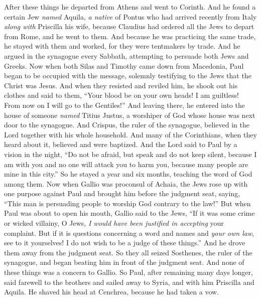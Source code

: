 \begin{biblechapter} %
 After these things he departed from Athens and went to Corinth.
\verse And he found a certain Jew \textit{named} Aquila, \textit{a native} of Pontus who had arrived recently from Italy \textit{along with} Priscilla his wife, because Claudius had ordered all the Jews to depart from Rome, and he went to them.
\verse And because he was practicing the same trade, he stayed with them and worked, for they were tentmakers by trade.
\verse And he argued in the synagogue every Sabbath, attempting to persuade both Jews and Greeks.
\verse Now when both Silas and Timothy came down from Macedonia, Paul began to be occupied with the message, solemnly testifying to the Jews that the Christ was Jesus.
\verse And when they resisted and reviled him, he shook out his clothes and said to them, “Your blood be on your own heads! I am guiltless! From now on I will go to the Gentiles!”
\verse And leaving there, he entered into the house of someone \textit{named} Titius Justus, a worshiper of God whose house was next door to the synagogue.
\verse And Crispus, the ruler of the synagogue, believed in the Lord together with his whole household. And many of the Corinthians, when they heard about it, believed and were baptized.
\verse And the Lord said to Paul by a vision in the night, “Do not be afraid, but speak and do not keep silent,
\verse because I am with you and no one will attack you to harm you, because many people are mine in this city.”
\verse So he stayed a year and six months, teaching the word of God among them.
 Now when Gallio was proconsul of Achaia, the Jews rose up with one purpose against Paul and brought him before the judgment seat,
\verse saying, “This man is persuading people to worship God contrary to the law!”
\verse But when Paul was about to open his mouth, Gallio said to the Jews, “If it was some crime or wicked villainy, O Jews, \textit{I would have been justified in accepting} your complaint.
\verse But if it is questions concerning a word and names and \textit{your own law}, see to it yourselves! I do not wish to be a judge of these things.”
\verse And he drove them away from the judgment seat.
\verse So they all seized Sosthenes, the ruler of the synagogue, and began beating him in front of the judgment seat. And none of these things was a concern to Gallio.
 So Paul, after remaining many days longer, said farewell to the brothers and sailed away to Syria, and with him Priscilla and Aquila. He shaved his head at Cenchrea, because he had taken a vow.

\end{biblechapter}
